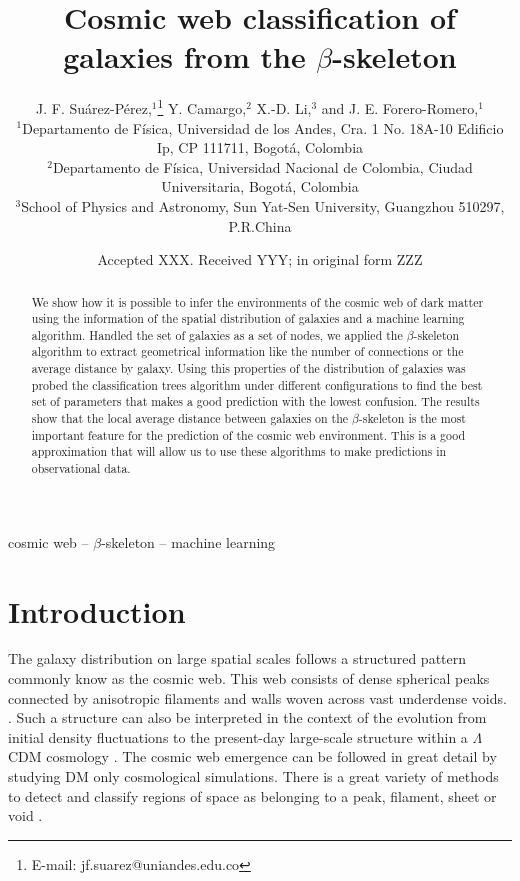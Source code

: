 \documentclass[usenatbib]{mnras}
\title[The $\beta$-skeleton and the T-web]{Cosmic web classification of galaxies from the $\beta$-skeleton}
\author[J. F. Su\'arez-P\'erez et al.]{
J. F. Su\'arez-P\'erez,$^{1}$\thanks{E-mail: jf.suarez@uniandes.edu.co}
Y. Camargo,$^{2}$ 
X.-D. Li,$^{3}$
and J. E. Forero-Romero,$^{1}$
\\
$^{1}$Departamento de F\'isica, Universidad de los Andes, Cra. 1 No. 18A-10 Edificio Ip, CP 111711, Bogot\'a, Colombia\\
$^{2}$Departamento de F\'isica, Universidad Nacional de Colombia, Ciudad Universitaria, Bogot\'a, Colombia\\
$^{3}$School of Physics and Astronomy, Sun Yat-Sen University, Guangzhou 510297, P.R.China\\
}
\date{Accepted XXX. Received YYY; in original form ZZZ}
\begin{document}
\label{firstpage}
\pagerange{\pageref{firstpage}--\pageref{lastpage}}
\maketitle

\begin{abstract}
We show how it is possible to infer the environments of the cosmic web
of dark matter using the information of the spatial distribution of
galaxies and a machine learning algorithm.
Handled the set of galaxies
as a set of nodes, we applied the $\beta$-skeleton algorithm to
extract geometrical information like the number of connections or the
average distance by galaxy. 
Using this properties of the distribution
of galaxies was probed the classification trees algorithm under
different configurations to find the best set of parameters that makes
a good prediction with the lowest confusion. 
The results show that the
local average distance between galaxies on the $\beta$-skeleton is the
most important feature for the prediction of the cosmic web
environment. 
This is a good approximation that will allow us to use
these algorithms to make predictions in observational data. 
\end{abstract}

\begin{keywords}
cosmic web -- $\beta$-skeleton -- machine learning
\end{keywords}


\section{Introduction}

The galaxy distribution on large spatial scales follows a structured 
pattern commonly know as the cosmic web. 
This web consists of dense spherical peaks connected by
anisotropic filaments and walls woven across vast underdense voids.
\citep{Bond1996}. 
Such a structure can also be interpreted in the context of 
the evolution from initial density fluctuations to the present-day 
large-scale structure within a $\Lambda$CDM cosmology \citep{ZelDovich1970,White1987}. 
The cosmic web emergence can be followed in great detail by studying DM only
cosmological simulations.
There is a great variety of methods to detect and classify regions of
space as belonging to a peak, filament, sheet or void
\citep{Libeskind2018}.
\end{document}
